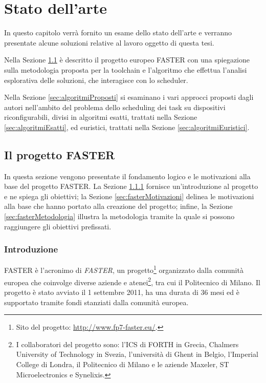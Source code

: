 \chapter{Stato dell'arte}
\label{chap:SOA}
\vspace{1cm}
In questo capitolo verrà fornito un esame dello stato dell'arte e verranno presentate 
alcune soluzioni relative al lavoro oggetto di questa tesi.

Nella Sezione \ref{sec:progettoFASTER} è descritto il progetto europeo 
\ac{FASTER} con una spiegazione sulla metodologia proposta per la toolchain e 
l'algoritmo che effettua l'analisi esplorativa delle soluzioni, che interagisce 
con lo scheduler.

Nella Sezione \ref{sec:algoritmiProposti} si esaminano i vari approcci proposti 
dagli autori nell'ambito del problema dello scheduling dei task su dispositivi 
riconfigurabili, divisi in algoritmi esatti, trattati nella Sezione 
\ref{sec:algoritmiEsatti}, ed euristici, trattati nella Sezione 
\ref{sec:algoritmiEuristici}.


\section[Il progetto \acs{FASTER}]{Il progetto \acs{FASTER}}
\label{sec:progettoFASTER}
In questa sezione vengono presentate il fondamento logico e le motivazioni alla 
base del progetto \ac{FASTER}. La Sezione \ref{sec:fasterIntro} fornisce 
un'introduzione al progetto e ne spiega gli obiettivi; la Sezione 
\ref{sec:fasterMotivazioni} delinea le motivazioni alla base che hanno 
portato alla creazione del progetto; infine, la Sezione 
\ref{sec:fasterMetodologia} illustra la metodologia tramite la quale si possono 
raggiungere gli obiettivi prefissati.

\subsection{Introduzione}
\label{sec:fasterIntro}
\ac{FASTER} è l'acronimo di \emph{\acl{FASTER}}, un progetto\footnote{Sito del 
progetto: \url{http://www.fp7-faster.eu/}.} organizzato dalla comunità europea 
che coinvolge diverse aziende e atenei\footnote{I collaboratori del progetto 
sono: l'\ac{ICS} di \ac{FORTH} in Grecia, Chalmers University of Technology in 
Svezia, l'università di Ghent in Belgio, l'Imperial College di Londra, il 
Politecnico di Milano e le aziende Maxeler, ST Microelectronics e Synelixis.}, 
tra cui il Politecnico di Milano. Il progetto è stato avviato il 1 settembre 
2011, ha una durata di 36 mesi ed è supportato tramite fondi stanziati dalla 
comunità europea.


